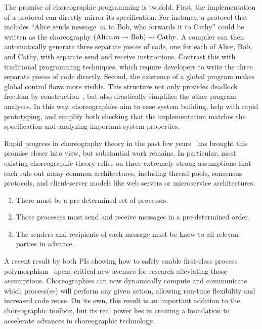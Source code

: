 The promise of choreographic programming is twofold.
First, the implementation of a protocol can directly mirror its specification.
For instance, a protocol that includes ``Alice sends message~$m$ to Bob, who forwards it to Cathy''
could be written as the choreography $(\text{Alice}.m \rightsquigarrow \text{Bob}) \rightsquigarrow \text{Cathy}$.
A compiler can then automatically generate three separate pieces of code, one for each of Alice, Bob, and Cathy,
with separate send and receive instructions.
Contrast this with traditional programming techniques, which require developers to write the three separate pieces of code directly.
Second, the existence of a global program makes global control flows more visible.
This structure not only provides deadlock freedom by construction~\cite{CarboneM13}, but also drastically simplifies the other program analyses.
In this way, choreographies aim to ease system building, help with rapid prototyping,
and simplify both checking that the implementation matches the specification
and analyzing important system properties.

Rapid progress in choreography theory in the past few years~\citep[e.g.,][]{HirschG22,CruzFilipeGLMP22,CruzFilipeGLMP23,BatesK+25,SamuelsonHC25}
has brought this promise closer into view, but substantial work remains.
In particular, most existing choreographic theory relies on three extremely strong assumptions
that each rule out many common architectures, including thread pools, consensus protocols, and client-server models like web servers or microservice architectures:
\begin{enumerate}
  \item\label{li:assume:static-locs}
    There must be a pre-determined set of processes.
  \item\label{li:assume:known-order}
    Those processes must send and receive messages in a pre-determined order.
  \item\label{li:assume:known-endpoints}
    The senders and recipients of each message must be know to all relevant parties in advance.
\end{enumerate}

A recent result by both PIs showing how to safely enable first-class process polymorphism~\citep{SamuelsonHC25} opens critical new avenues for research alleviating those assumptions.
Choreographies can now dynamically compute and communicate which process(es) will perform any given action,
allowing run-time flexibility and increased code reuse.
On its own, this result is an important addition to the choreographic toolbox,
but its real power lies in creating a foundation to accelerate advances in choreographic technology.

